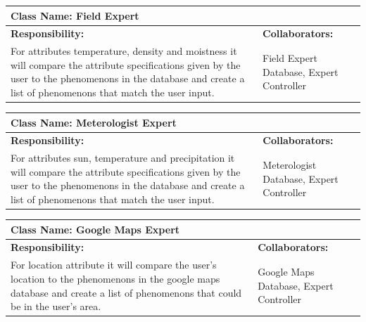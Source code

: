 \documentclass[]{article}
\begin{document}
	\begin{table}[ht]
		\centering
		\begin{tabular}{|p{5cm}|p{5cm}|}
		\hline 
		 \multicolumn{2}{|l|}{\textbf{Class Name: Field Expert}} \\
		\hline
		\textbf{Responsibility:} & \textbf{Collaborators:} \\
		\hline
		For attributes temperature, density and moistness it will compare the attribute specifications given by the user to the phenomenons in the database and create a list of phenomenons that match the user input. \vspace{1in} & Field Expert Database, Expert Controller\\
		\hline
		\end{tabular}
	\end{table}
	
	\begin{table}[ht]
		\centering
		\begin{tabular}{|p{5cm}|p{5cm}|}
		\hline 
		 \multicolumn{2}{|l|}{\textbf{Class Name: Meterologist Expert}} \\
		\hline
		\textbf{Responsibility:} & \textbf{Collaborators:} \\
		\hline
		For attributes sun, temperature and precipitation it will compare the attribute specifications given by the user to the phenomenons in the database and create a list of phenomenons that match the user input.\vspace{1in} & Meterologist Database, Expert Controller\\
		\hline
		\end{tabular}
	\end{table}

	\begin{table}[ht]
		\centering
		\begin{tabular}{|p{5cm}|p{5cm}|}
		\hline 
		 \multicolumn{2}{|l|}{\textbf{Class Name: Google Maps Expert}} \\
		\hline
		\textbf{Responsibility:} & \textbf{Collaborators:} \\
		\hline
		For location attribute it will compare the user's location to the phenomenons in the google maps database and create a list of phenomenons that could be in the user's area.\vspace{1in} & Google Maps Database, Expert Controller\\
		\hline
		\end{tabular}
	\end{table}
\end{document}
